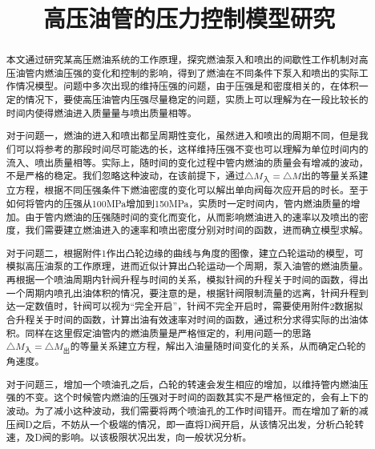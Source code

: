 \documentclass[withoutpreface,bwprint]{cumcmthesis} %
\title{高压油管的压力控制模型研究}
\begin{document}
\maketitle

 \begin{abstract}
 	本文通过研究某高压燃油系统的工作原理，探究燃油泵入和喷出的间歇性工作机制对高压油管内燃油压强的变化和控制的影响，得到了燃油在不同条件下泵入和喷出的实际工作情况模型。问题中多次出现的维持压强的问题，由于压强是和密度相关的，在体积一定的情况下，要使高压油管内压强尽量稳定的问题，实质上可以理解为在一段比较长的时间内使得燃油进入质量量与喷出质量相等。
 	
 	对于问题一，燃油的进入和喷出都呈周期性变化，虽然进入和喷出的周期不同，但是我们可以将参考的那段时间尽可能选的长，这样维持压强不变也可以理解为单位时间内的流入、喷出质量相等。实际上，随时间的变化过程中管内燃油的质量会有增减的波动，不是严格的稳定。我们忽略这种波动，在该前提下，通过$\triangle M_{\text{入}}=\triangle M{\text{出}}$的等量关系建立方程，根据不同压强条件下燃油密度的变化可以解出单向阀每次应开启的时长。至于如何将管内的压强从100MPa增加到150MPa，实质时一定时间内，管内燃油质量的增加。由于管内燃油的压强随时间的变化而变化，从而影响燃油进入的速率以及喷出的密度，我们需要建立燃油进入的速率和喷出密度分别对时间的函数，进而确立模型求解。
 	
 	对于问题二，根据附件1作出凸轮边缘的曲线与角度的图像，建立凸轮运动的模型，可模拟高压油泵的工作原理，进而近似计算出凸轮运动一个周期，泵入油管的燃油质量。再根据一个喷油周期内针阀升程与时间的关系，模拟针阀的升程关于时间的函数，得出一个周期内喷孔出油体积的情况，要注意的是，根据针阀限制流量的远离，针阀升程到达一定数值时，针阀可以视为“完全开启”，针阀不完全开启时，需要使用附件2数据拟合升程关于时间的函数，计算出油有效速率对时间的函数，通过积分求得实际的出油体积。同样在这里假定油管内的燃油质量是严格恒定的，利用问题一的思路$\triangle M_{\text{入}}=\triangle M_{\text{出}}$的等量关系建立方程，解出入油量随时间变化的关系，从而确定凸轮的角速度。
 	
 	对于问题三，增加一个喷油孔之后，凸轮的转速会发生相应的增加，以维持管内燃油压强的不变。这个时候管内燃油的压强对于时间的函数其实不是严格恒定的，会有上下的波动。为了减小这种波动，我们需要将两个喷油孔的工作时间错开。而在增加了新的减压阀D之后，不妨从一个极端的情况，即一直将D阀开启，从该情况出发，分析凸轮转速，及D阀的影响。以该极限状况出发，向一般状况分析。
 		
 \end{abstract}

\end{document}
